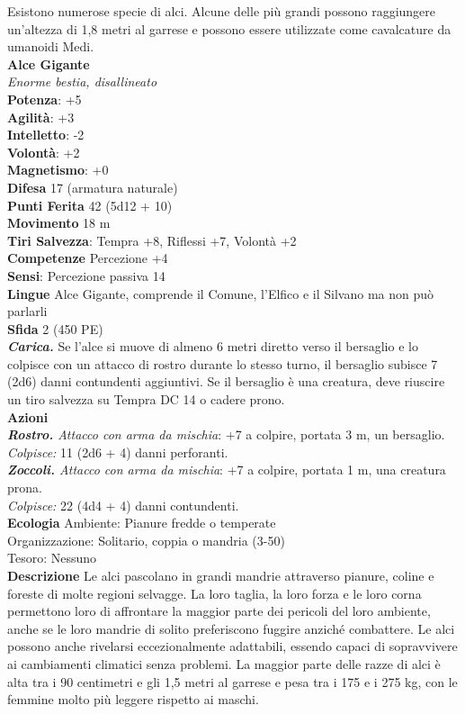 \begin{multicols}{2}
Esistono numerose specie di alci. Alcune delle più grandi possono raggiungere un'altezza di 1,8 metri al garrese e possono essere utilizzate come cavalcature da umanoidi Medi.\\

\medskip\textbf{Alce Gigante}\\
\emph{Enorme bestia, disallineato}\\
\textbf{Potenza}: +5\\
\textbf{Agilità}: +3\\
\textbf{Intelletto}: -2\\
\textbf{Volontà}: +2\\
\textbf{Magnetismo}: +0\\
\textbf{Difesa} 17 (armatura naturale)\\
\textbf{Punti Ferita} 42 (5d12 + 10)\\
\textbf{Movimento} 18 m\\
\textbf{Tiri Salvezza}:  Tempra +8, Riflessi +7, Volontà +2\\
\textbf{Competenze} Percezione +4\\
\textbf{Sensi}: Percezione passiva 14\\
\textbf{Lingue} Alce Gigante, comprende il Comune, l'Elfico e il Silvano ma non può parlarli\\
\textbf{Sfida} 2 (450 PE)\smallskip\\
\emph{\textbf{Carica.}} Se l'alce si muove di almeno 6 metri diretto verso il bersaglio e lo colpisce con un attacco di rostro durante lo stesso turno, il bersaglio subisce 7 (2d6) danni contundenti aggiuntivi. Se il bersaglio è una creatura, deve riuscire un tiro salvezza su Tempra DC 14 o cadere prono.\\
\smallskip\textbf{Azioni}\\
\emph{\textbf{Rostro.} Attacco con arma da mischia}: +7 a colpire, portata 3 m, un bersaglio.\\
\emph{Colpisce:} 11 (2d6 + 4) danni perforanti.\\
\emph{\textbf{Zoccoli.} Attacco con arma da mischia}: +7 a colpire, portata 1 m, una creatura prona.\\
\emph{Colpisce:} 22 (4d4 + 4) danni contundenti.\\
\textbf{Ecologia}
Ambiente: Pianure fredde o temperate\\
Organizzazione: Solitario, coppia o mandria (3-50)\\
Tesoro: Nessuno\\
\textbf{Descrizione}
Le alci pascolano in grandi mandrie attraverso pianure, coline e foreste di molte regioni selvagge. La loro taglia, la loro forza e le loro corna permettono loro di affrontare la maggior parte dei pericoli del loro ambiente, anche se le loro mandrie di solito preferiscono fuggire anziché combattere. Le alci possono anche rivelarsi eccezionalmente adattabili, essendo capaci di sopravvivere ai cambiamenti climatici senza problemi. La maggior parte delle razze di alci è alta tra i 90 centimetri e gli 1,5 metri al garrese e pesa tra i 175 e i 275 kg, con le femmine molto più leggere rispetto ai maschi.\\

\end{multicols}
